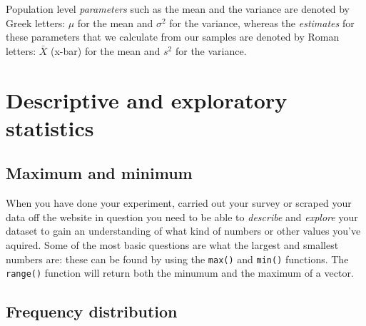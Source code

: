 \documentclass[
]{book}
\begin{document}
Population level \emph{parameters} such as the mean and the variance are denoted by Greek letters: \(\mu\) for the mean and \(\sigma^2\) for the variance, whereas the \emph{estimates} for these parameters that we calculate from our samples are denoted by Roman letters: \(\bar{X}\) (x-bar) for the mean and \(s^2\) for the variance.

\hypertarget{descriptive-and-exploratory-statistics}{%
\section{Descriptive and exploratory statistics}\label{descriptive-and-exploratory-statistics}}

\hypertarget{maximum-and-minimum}{%
\subsection{Maximum and minimum}\label{maximum-and-minimum}}

When you have done your experiment, carried out your survey or scraped your data off the website in question you need to be able to \emph{describe} and \emph{explore} your dataset to gain an understanding of what kind of numbers or other values you've aquired. Some of the most basic questions are what the largest and smallest numbers are: these can be found by using the \texttt{max()} and \texttt{min()} functions. The \texttt{range()} function will return both the minumum and the maximum of a vector.

\hypertarget{frequency-distribution}{%
\subsection{Frequency distribution}\label{frequency-distribution}}
\end{document}
